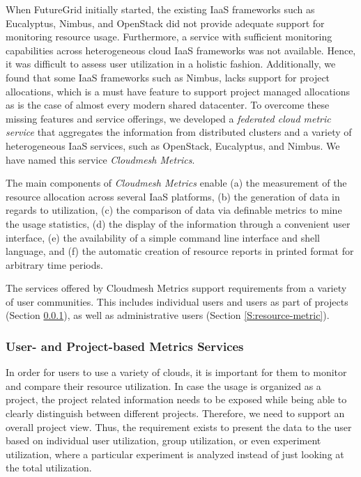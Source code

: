 \documentclass{tex/sig-alternate-2013}
\begin{document}

When FutureGrid initially started, the existing IaaS frameworks such as Eucalyptus, Nimbus, and OpenStack did not provide adequate support for monitoring resource usage. Furthermore, a service with sufficient monitoring capabilities across heterogeneous cloud IaaS frameworks was not available. Hence, it was difficult to assess user utilization in a holistic fashion. Additionally, we found that some IaaS frameworks such as Nimbus, lacks support for project allocations, which is a must have feature to support project managed allocations as is the case of almost every modern shared datacenter.  To overcome these missing features and service offerings, we developed a {\em federated cloud metric service} that aggregates the information from distributed clusters and a variety of heterogeneous IaaS services, such as OpenStack, Eucalyptus, and Nimbus. We have named this service {\em Cloudmesh Metrics}.

The main components of {\em Cloudmesh Metrics} enable (a) the measurement of the resource allocation across several IaaS platforms, (b) the generation of data in regards to utilization, (c) the comparison of data via definable metrics to mine the usage statistics, (d) the display of the information through a convenient user interface, (e) the availability of a simple command line interface and shell language, and (f) the automatic creation of resource reports in printed format for arbitrary time periods.

The services offered by Cloudmesh Metrics support requirements from a variety of user communities. This includes individual users and users as part of projects (Section \ref{S:user-metric}), as well as administrative users (Section \ref{S:resource-metric}).



\subsubsection{User- and Project-based Metrics Services}\label{S:user-metric} 

In order for users to use a variety of clouds, it is important for them to monitor and compare their resource utilization. In case the usage is organized as a project, the project related information needs to be exposed while being able to clearly distinguish between different projects. Therefore, we need to support an overall project view.  Thus, the requirement exists to present the data to the user based on individual user utilization, group utilization, or even experiment utilization, where a particular experiment is analyzed instead of just looking at the total utilization.
\end{document}
